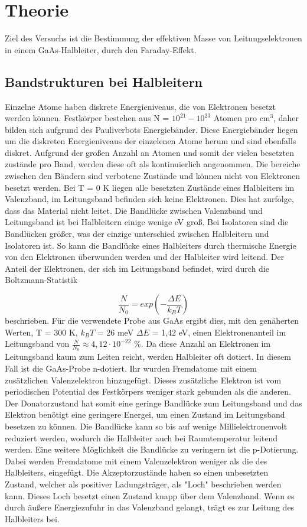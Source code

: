 \section{Theorie}
\label{sec:Theorie}
Ziel des Versuchs ist die Bestimmung der effektiven Masse von Leitungselektronen in einem GaAs-Halbleiter, 
durch den Faraday-Effekt.

\subsection{Bandstrukturen bei Halbleitern}
Einzelne Atome haben diskrete Energieniveaus, die von Elektronen besetzt werden können. 
Festkörper bestehen aus N = $10^21 - 10^23$ Atomen pro cm$^3$, daher bilden sich aufgrund des Pauliverbots Energiebänder.
Diese Energiebänder liegen um die diskreten Energieniveaus der einzelenen Atome herum und sind ebenfalls diskret. 
Aufgrund der großen Anzahl an Atomen und somit der vielen besetzten zustände pro Band, werden diese oft als kontinuierlich angenommen. 
Die bereiche zwischen den Bändern sind verbotene Zustände und können nicht von Elektronen besetzt werden. 
Bei T = 0 K liegen alle besetzten Zustände eines Halbleiters im Valenzband, im Leitungsband befinden sich keine Elektronen.
Dies hat zurfolge, dass das Material nicht leitet.
Die Bandlücke zwischen Valenzband und Leitungsband ist bei Halbleitern einige wenige eV groß. 
Bei Isolatoren sind die Bandlücken größer, was der einzige unterschied zwischen Halbleitern und Isolatoren ist.
So kann die Bandlücke eines Halbleiters durch thermische Energie von den Elektronen überwunden werden und der 
Halbleiter wird leitend. Der Anteil der Elektronen, der sich im Leitungsband befindet, wird durch die Boltzmann-Statistik

\begin{equation}
    \frac{N}{N_0} = exp \left(-\frac{\Delta E}{k_B T}\right)
\end{equation} 
beschrieben.
Für die verwendete Probe aus GaAs ergibt dies, mit den genäherten Werten, T = 300 K, $k_B T$ = 26 meV $\Delta E$ = 1,42 eV, 
einen Elektronenanteil im Leitungsband von $\frac{N}{N_0} \approx 4,12 \cdot 10^{-22}$ \%.
Da diese Anzahl an Elektronen im Leitungsband kaum zum Leiten reicht, werden Halbleiter oft dotiert. 
In diesem Fall ist die GaAs-Probe n-dotiert. Ihr wurden Fremdatome mit einem zusätzlichen Valenzelektron hinzugefügt.
Dieses zusätzliche Elektron ist vom periodischen Potential des Festkörpers weniger stark gebunden als die anderen. 
Der Donatorzustand hat somit eine geringe Bandlücke zum Leitungsband 
und das Elektron benötigt eine geringere Energei, um einen Zustand im Leitungsband besetzen zu können.
Die Bandlücke kann so bis auf wenige Millielektronenvolt reduziert werden, wodurch die Halbleiter auch bei 
Raumtemperatur leitend werden.
Eine weitere Möglichkeit die Bandlücke zu veringern ist die p-Dotierung. 
Dabei werden Fremdatome mit einem Valenzelektron weniger als die des Halbleiters, eingefügt. 
Die Akzeptorzustände haben so einen unbesetzten Zustand, welcher als positiver Ladungsträger, als "Loch" beschrieben werden kann. 
Dieses Loch besetzt einen Zustand knapp über dem Valenzband. Wenn es durch äußere Energiezufuhr 
in das Valenzband gelangt, trägt es zur Leitung des Halbleiters bei.

